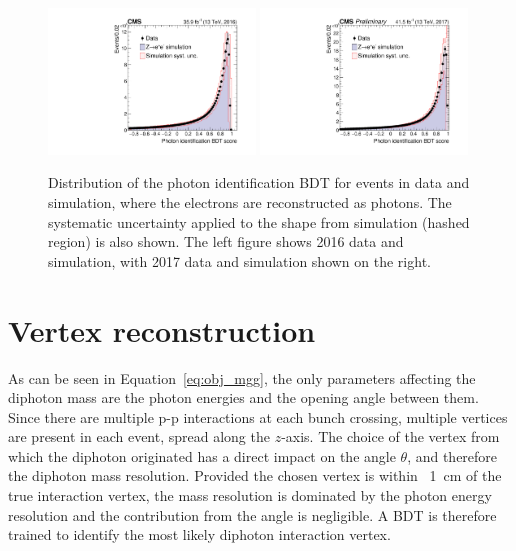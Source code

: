 \begin{figure}[h!]
  \centering
  \includegraphics[width=0.49\textwidth]{Figures/Objects/ZeeIDMVA2016}
  \includegraphics[width=0.49\textwidth]{Figures/Objects/ZeeIDMVA2017}
  \caption[Photon identification BDT score validation in \Zee events.]
  {
    Distribution of the photon identification BDT
    for \Zee events in data and simulation, where the electrons are reconstructed as photons. 
    The systematic uncertainty applied to the shape from simulation (hashed region) is also shown.
    The left figure shows 2016 data and simulation, with 2017 data and simulation shown on the right.
  }
  \label{fig:obj_ZeeIDMVA}
\end{figure}

\section{Vertex reconstruction}

As can be seen in Equation~\ref{eq:obj_mgg}, 
the only parameters affecting the diphoton mass are the photon energies and the opening angle between them.
Since there are multiple p-p interactions at each bunch crossing, multiple vertices are present in each event, spread along the $z$-axis.
The choice of the vertex from which the diphoton originated has a direct impact on the angle $\theta$, 
and therefore the diphoton mass resolution.
Provided the chosen vertex is within ~\SI{1}{cm} of the true interaction vertex,
the mass resolution is dominated by the photon energy resolution and the contribution from the angle is negligible.
A BDT is therefore trained to identify the most likely diphoton interaction vertex.

